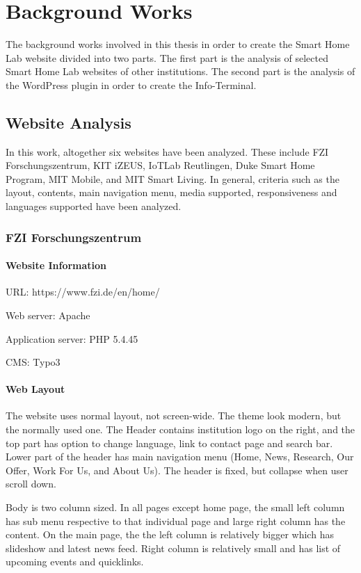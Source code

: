\chapter{Background Works}
The background works involved in this thesis in order to create the Smart Home Lab website divided into two parts. The first part is the analysis of selected Smart Home Lab websites of other institutions. The second part is the analysis of the WordPress plugin in order to create the Info-Terminal.

\section{Website Analysis}
In this work, altogether six websites have been analyzed. These include FZI Forschungszentrum, KIT iZEUS, IoTLab Reutlingen, Duke Smart Home Program, MIT Mobile, and MIT Smart Living. In general, criteria such as the layout, contents, main navigation menu, media supported, responsiveness and languages supported have been analyzed.

\subsection{FZI Forschungszentrum}

\subsubsection*{Website Information}
\begin{itemize*}
\item URL: https://www.fzi.de/en/home/
\item Web server: Apache
\item Application server: PHP 5.4.45
\item CMS: Typo3
\end{itemize*}

\subsubsection*{Web Layout}
The website uses normal layout, not screen-wide. The theme look modern, but the normally used one. The Header contains institution logo on the right, and the top part has option to change language, link to contact page and search bar. Lower part of the header has main navigation menu (Home, News, Research, Our Offer, Work For Us, and About Us). The header is fixed, but collapse when user scroll down.

Body is two column sized. In all pages except home page, the small left column has sub menu respective to that individual page and large right column has the content. On the main page, the the left column is relatively bigger which has slideshow and latest news feed. Right column is relatively small and has list of upcoming events and quicklinks.

